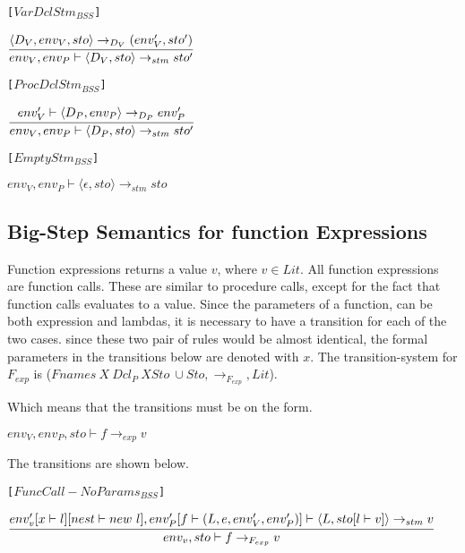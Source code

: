 {\texttt{[$VarDclStm_{BSS}$]}\\
\begin{center}
	\begin{math}
		\cfrac
			{\langle D_V, env_V, sto \rangle \rightarrow_{D_V} (env_V', sto')}
			{env_V, env_P \vdash \langle D_V, sto \rangle \rightarrow_{stm} sto'}
	\end{math}
\end{center}

\texttt{[$ProcDclStm_{BSS}$]}\\
\begin{center}
	\begin{math}
		\cfrac
			{env_V' \vdash \langle D_P, env_P \rangle \rightarrow_{D_P} env_P'}
			{env_V, env_P \vdash \langle D_P, sto \rangle \rightarrow_{stm} sto'}
	\end{math}
\end{center}

\texttt{[$EmptyStm_{BSS}$]}\\
\begin{center}
	\begin{math}
		{env_V, env_P \vdash \langle \epsilon, sto \rangle \rightarrow_{stm} sto}
	\end{math}
\end{center}

\subsection{Big-Step Semantics for function Expressions}
Function expressions returns a value $v$, where $v \in Lit$.
All function expressions are function calls.
These are similar to procedure calls, except for the fact that function calls evaluates to a value.
Since the parameters of a function, can be both expression and lambdas, it is necessary to have a transition for each of the two cases.
since these two pair of rules would be almost identical, the formal parameters in the transitions below are denoted with $x$.
The transition-system for $F_{exp}$ is ($Fnames\ X\ Dcl_P\ X Sto\ \cup Sto, \rightarrow_{F_{exp}}, Lit$).

Which means that the transitions must be on the form.
\begin{center}
	$env_V, env_P, sto \vdash f \rightarrow_{exp} v$
\end{center}
The transitions are shown below.

\texttt{[$FuncCall-NoParams_{BSS}$]}\\
\begin{center}
	\begin{math}
	\cfrac
	{env_v'[x \vdash l][nest \vdash new\ l], env_P'[f \vdash (L, e, env_V', env_P')] \vdash \langle L, sto[l \vdash v] \rangle \rightarrow_{stm} v}
	{env_v, sto \vdash f \rightarrow_{F_{exp}} v}
	\end{math}
	

\end{center}}
